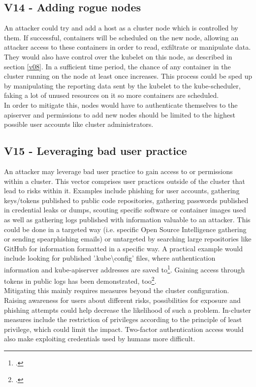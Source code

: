 \subsection{V14 - Adding rogue nodes}
\vspace{-0.25cm}
An attacker could try and add a host as a cluster node which is controlled by them. If successful, containers will be scheduled on the new node, allowing an attacker access to these containers in order to read, exfiltrate or manipulate data. They would also have control over the kubelet on this node, as described in section \ref{v08}.
In a sufficient time period, the chance of any container in the cluster running on the node at least once increases. This process could be sped up by manipulating the reporting data sent by the kubelet to the kube-scheduler, faking a lot of unused resources on it so more containers are scheduled. \\
In order to mitigate this, nodes would have to authenticate themselves to the apiserver and permissions to add new nodes should be limited to the highest possible user accounts like cluster administrators.

\vspace{-0.25cm}
\subsection{V15 - Leveraging bad user practice}
\vspace{-0.25cm}
An attacker may leverage bad user practice to gain access to or permissions within a cluster. 
This vector comprises user practices outside of the cluster that lead to risks within it.
Examples include phishing for user accounts, gathering keys/tokens published to public code repositories, gathering passwords published in credential leaks or dumps, scouting specific software or container images used as well as gathering logs published with information valuable to an attacker.
This could be done in a targeted way (i.e. specific Open Source Intelligence gathering or sending spearphishing emails) or untargeted by searching large repositories like GitHub for information formatted in a specific way. A practical example would include looking for published '.kube\textbackslash config' files, where authentication information and kube-apiserver addresses are saved to\footcite[][, section 'Define clusters, users, and contexts']{kubectlClusterAccess}. Gaining access through tokens in public logs has been demonstrated, too\footcite[][, section 'Results and notable findings']{ciKnew}. \\
Mitigating this mainly requires measures beyond the cluster configuration. Raising awareness for users about different risks, possibilities for exposure and phishing attempts  could help decrease the likelihood of such a problem. In-cluster measures include the restriction of privileges according to the principle of least privilege, which could limit the impact. Two-factor authentication access would also make exploiting credentials used by humans more difficult.

